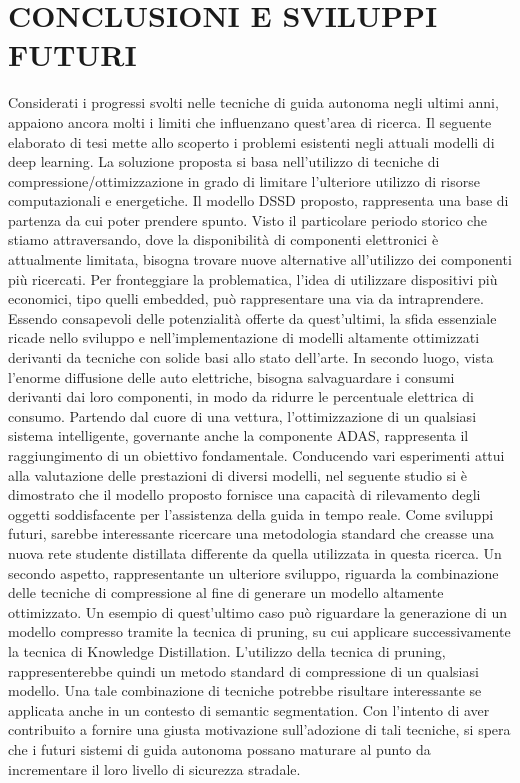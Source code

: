 
\chapter{CONCLUSIONI E SVILUPPI FUTURI}
\label{Capitolo5}
\thispagestyle{empty}
Considerati i progressi svolti nelle tecniche di guida autonoma negli ultimi anni, appaiono ancora molti i limiti che influenzano quest'area di ricerca. Il seguente elaborato di tesi mette allo scoperto i problemi esistenti negli attuali modelli di deep learning. La soluzione proposta si basa nell'utilizzo di tecniche di compressione/ottimizzazione in grado di limitare l'ulteriore utilizzo di risorse computazionali e energetiche. Il modello DSSD proposto, rappresenta una base di partenza da cui poter prendere spunto. Visto il particolare periodo storico che stiamo attraversando, dove la disponibilità di componenti elettronici è attualmente limitata, bisogna trovare nuove alternative all'utilizzo dei componenti più ricercati. Per fronteggiare la problematica, l'idea di utilizzare dispositivi più economici, tipo quelli embedded, può rappresentare una via da intraprendere.
Essendo consapevoli delle potenzialità offerte da quest'ultimi, la sfida essenziale ricade nello sviluppo e nell'implementazione di modelli altamente ottimizzati derivanti da tecniche con solide basi allo stato dell'arte. In secondo luogo, vista l'enorme diffusione delle auto elettriche, bisogna salvaguardare i consumi derivanti dai loro componenti, in modo da ridurre le percentuale elettrica di consumo. Partendo dal cuore di una vettura, l'ottimizzazione di un qualsiasi sistema intelligente, governante anche la componente ADAS,  rappresenta il raggiungimento di un obiettivo fondamentale. Conducendo vari esperimenti attui alla valutazione delle prestazioni di diversi modelli, nel seguente studio si è dimostrato che il modello proposto fornisce una capacità di rilevamento degli oggetti soddisfacente per l'assistenza della guida in tempo reale.
Come sviluppi futuri, sarebbe interessante ricercare una metodologia standard che creasse una nuova rete studente distillata differente da quella utilizzata in questa ricerca. Un secondo aspetto, rappresentante un ulteriore sviluppo, riguarda la combinazione delle tecniche di compressione al fine di generare un modello altamente ottimizzato. Un esempio di quest'ultimo caso può riguardare la generazione di un modello compresso tramite la tecnica di pruning, su cui applicare successivamente la tecnica di Knowledge Distillation. L'utilizzo della tecnica di pruning, rappresenterebbe quindi un metodo standard di compressione di un qualsiasi modello. Una tale combinazione di tecniche potrebbe risultare interessante se applicata anche in un contesto di semantic segmentation. Con l'intento di aver contribuito a fornire una giusta motivazione sull'adozione di tali tecniche, si spera che i futuri sistemi di guida autonoma possano maturare al punto da incrementare il loro livello di sicurezza stradale.